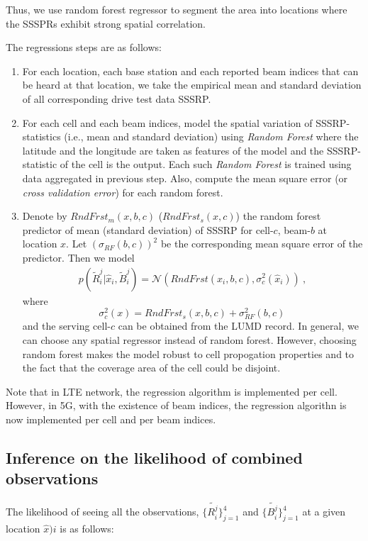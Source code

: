 \documentclass[conference, 10pt]{IEEEtran}
\begin{document}
Thus, we use random forest regressor to segment the area into locations where the SSSPRs
exhibit strong spatial correlation. 

The regressions steps are as follows:

\begin{enumerate}
\item For each location, each base station and each reported beam indices that can be heard at that location, we
take the empirical mean and standard deviation of all corresponding drive test data
SSSRP. 

\item For each cell and each beam indices, model the spatial variation of SSSRP-statistics (i.e., mean and
standard deviation) using {\em Random Forest} where the latitude and the longitude are 
taken as features of the model and the SSSRP-statistic  of the cell is the output. Each such {\em
Random Forest} is trained using data aggregated in previous step. Also,
compute the mean square error (or {\em cross validation error})
for each random forest. 

\item Denote by $RndFrst_m(x,b,c)$ ($RndFrst_s(x,c)$) the random forest predictor of
mean (standard deviation) of SSSRP for cell-$c$, beam-$b$
at location $x$. Let $(\sigma_{RF}(b,c))^2$ be the corresponding
mean square error of the predictor. Then we model
\begin{align}
p(\tilde{R}^j_i|\hat{x}_{i}, \tilde{B}^j_i) =
\mathcal{N}(RndFrst(\hat{x}_{i},b,c), \sigma_c^2(\hat{x}_i))\ ,
\label{eqn:rndfrst}
\end{align}
where $$\sigma_c^2(x) = RndFrst_s(x,b,c) + \sigma_{RF}^2(b,c)\,$$ 
and the serving cell-$c$ can be obtained from the LUMD record. In general, we
can choose any spatial regressor instead of random forest. However, choosing
random forest makes the model robust to cell propogation properties and to the
fact that the coverage area of the cell could be disjoint.
\end{enumerate}

Note that in LTE network, the regression algorithm is implemented per cell. However, in 5G, with the existence of
beam indices, the regression algorithn is now implemented per cell and per beam indices.


\subsection{Inference on the likelihood of combined observations}
\label{sec:prob-combined}
The likelihood of seeing all the observations, $\{\tilde{R^j_i}\}_{j=1}^4$ and $\{\tilde{B^j_i}\}_{j=1}^4$ at a given location $\hat{x}){i}$ is as follows:
\end{document}
